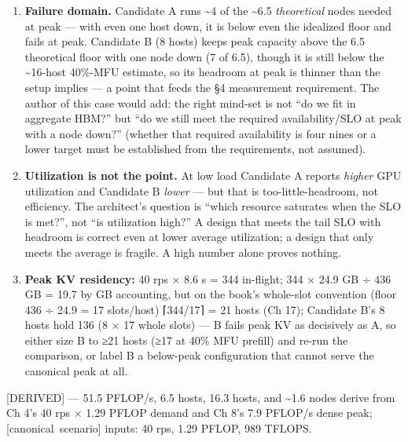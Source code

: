 \begin{enumerate}
  latency climb well past the SLO under burst. Candidate B's 8 hosts are
  only \emph{defensible at all} because they sit above the
  \textasciitilde6.5 theoretical floor --- but note they sit
  \emph{below} the \textasciitilde16-host 40\%-MFU estimate, so the
  decision is not closed by this check alone: it still depends on
  measuring actual sustained prefill efficiency (see §4).
\item
  \textbf{Failure domain.} Candidate A runs \textasciitilde4 of the
  \textasciitilde6.5 \emph{theoretical} nodes needed at peak --- with
  even one host down, it is below even the idealized floor and fails at
  peak. Candidate B (8 hosts) keeps peak capacity above the 6.5
  theoretical floor with one node down (7 of 6.5), though it is still
  below the \textasciitilde16-host 40\%-MFU estimate, so its headroom at
  peak is thinner than the setup implies --- a point that feeds the §4
  measurement requirement. The author of this case would add: the right
  mind-set is not ``do we fit in aggregate HBM?'' but ``do we still meet
  the required availability/SLO at peak with a node down?'' (whether
  that required availability is four nines or a lower target must be
  established from the requirements, not assumed).
\item
  \textbf{Utilization is not the point.} At low load Candidate A reports
  \emph{higher} GPU utilization and Candidate B \emph{lower} --- but
  that is too-little-headroom, not efficiency. The architect's question
  is ``which resource saturates when the SLO is met?'', not ``is
  utilization high?'' A design that meets the tail SLO with headroom is
  correct even at lower average utilization; a design that only meets
  the average is fragile. A high number alone proves nothing.
\item
  \textbf{Peak KV residency:} 40 rps × 8.6 s = 344 in-flight; 344 × 24.9
  GB ÷ 436 GB = 19.7 by GB accounting, but on the book's whole-slot
  convention (floor 436 ÷ 24.9 = 17 slots/host) ⌈344/17⌉ = 21 hosts (Ch
  17); Candidate B's 8 hosts hold 136 (8 × 17 whole slots) --- B fails
  peak KV as decisively as A, so either size B to ≥21 hosts (≥17 at 40\%
  MFU prefill) and re-run the comparison, or label B a below-peak
  configuration that cannot serve the canonical peak at all.
\end{enumerate}

\mbox{{[}DERIVED{]}} --- 51.5 PFLOP/s, 6.5 hosts, 16.3 hosts, and
\textasciitilde1.6 nodes derive from Ch 4's 40 rps × 1.29 PFLOP demand
and Ch 8's 7.9 PFLOP/s dense peak; \mbox{{[}canonical scenario{]}} inputs: 40
rps, 1.29 PFLOP, 989 TFLOPS.

